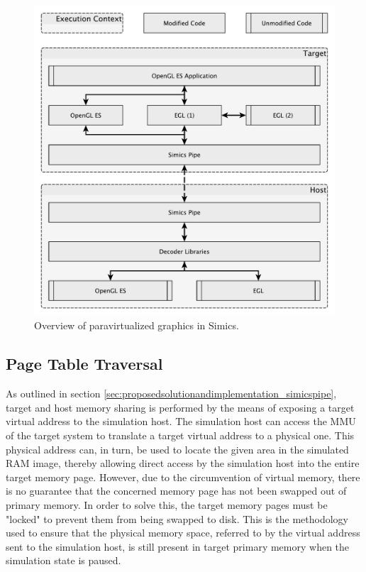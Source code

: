 \begin{figure}
\centering
\includegraphics[width=\linewidth]{img/yedoverview.pdf}
\caption{Overview of paravirtualized graphics in Simics.}
\label{fig:overview}
\end{figure}

\subsection{Page Table Traversal}
\label{sec:proposedsolutionandimplementation_pagetabletraversal}
As outlined in section \ref{sec:proposedsolutionandimplementation_simicspipe}, target and host memory sharing is performed by the means of exposing a target virtual address to the simulation host.
The simulation host can access the MMU of the target system to translate a target virtual address to a physical one.
This physical address can, in turn, be used to locate the given area in the simulated RAM image, thereby allowing direct access by the simulation host into the entire target memory page.
However, due to the circumvention of virtual memory, there is no guarantee that the concerned memory page has not been swapped out of primary memory.
In order to solve this, the target memory pages must be "locked" to prevent them from being swapped to disk.
This is the methodology used to ensure that the physical memory space, referred to by the virtual address sent to the simulation host, is still present in target primary memory when the simulation state is paused.

